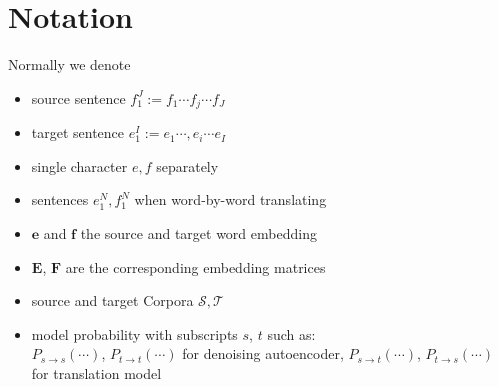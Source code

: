 \section{Notation}
Normally we denote
\begin{itemize}
	\item source sentence  ${f_1^J:= f_1 \cdots  f_j \cdots f_J}$ 
	\item target sentence  ${e_1^I:= e_1 \cdots, e_i \cdots e_I}$
	\item single character $e,f $ separately
	\item sentences $e_1^N, f_1^N$ when word-by-word translating
	\item $\bm{e}$ and $\bm{f}$ the source and target word embedding
	\item $\bm{E}$, $\bm{F}$ are the corresponding embedding matrices
	\item source and target Corpora $\mathcal{S}, \mathcal{T}$
	\item model probability with subscripts $s$, $t$ such as: \\ $P_{s\rightarrow s}(\cdots)$, $P_{t \rightarrow t }(\cdots)$ for denoising autoencoder, $P_{s\rightarrow t}(\cdots)$, $P_{t\rightarrow s}(\cdots)$ for translation model

\end{itemize}










